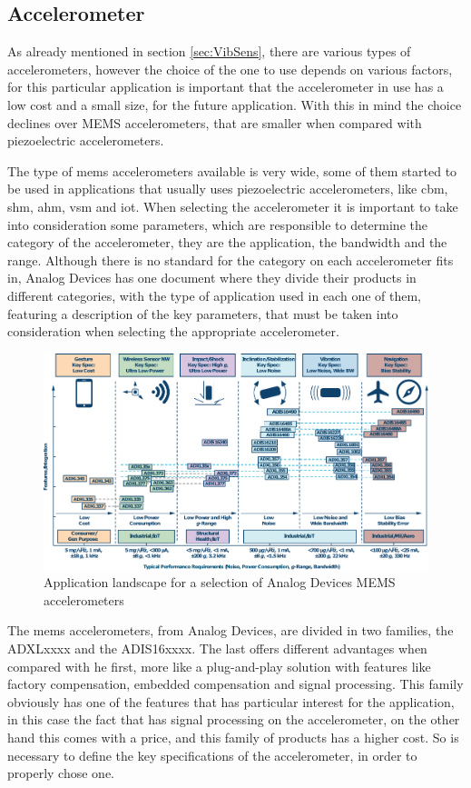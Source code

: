 \subsection{Accelerometer}
As already mentioned in section \ref{sec:VibSens}, there are various types of accelerometers, however the choice of the one to use depends on various factors, for this particular application is important that the accelerometer in use has a low cost and a small size, for the future application. With this in mind the choice declines over MEMS accelerometers, that are smaller when compared with piezoelectric accelerometers.

The type of \acrshort{mems} accelerometers available is very wide, some of them started to be used in applications that usually uses piezoelectric accelerometers, like \acrshort{cbm}, \acrshort{shm}, \acrshort{ahm}, \acrshort{vsm} and \acrshort{iot}. When selecting the accelerometer it is important to take into consideration some parameters, which are responsible to determine the category of the accelerometer, they are the application, the bandwidth and the range. Although there is no standard for the category on each accelerometer fits in, Analog Devices has one document where they divide their products in different categories, with the type of application used in each one of them, featuring a description of the key parameters, that must be taken into consideration when selecting the appropriate accelerometer.
\begin{figure}[]
    \centering
    \includegraphics[width=1\textwidth]{Chapters/4CHP/Figures/adTable.pdf}
    \caption{Application landscape for a selection of Analog Devices MEMS accelerometers}
    \label{fig:adtable}
\end{figure}
The \acrshort{mems} accelerometers, from Analog Devices, are divided in two families, the ADXLxxxx and the ADIS16xxxx. The last offers different advantages when compared with he first, more like a plug-and-play solution with features like factory compensation, embedded compensation and signal processing. This family obviously has one of the features that has particular interest for the application, in this case the fact that has signal processing on the accelerometer, on the other hand this comes with a price, and this family of products has a higher cost. So is necessary to define the key specifications of the accelerometer, in order to properly chose one\cite{AnalogDialogue51102017}\cite{AnalogDialogue51112017}.

